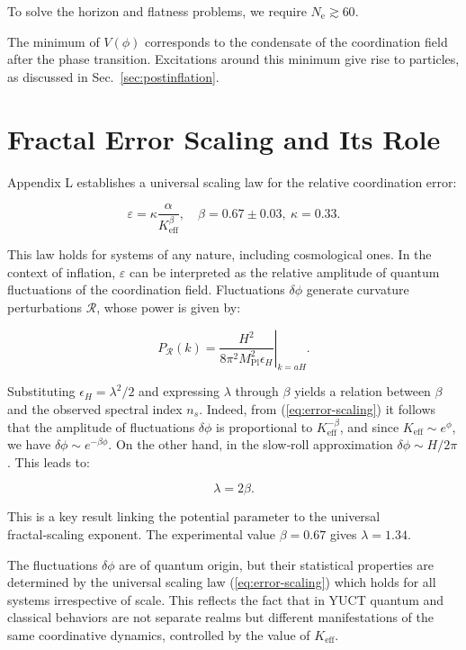 \documentclass[12pt]{article}
\theoremstyle{remark}
\newcommand{\Keff}{K_{\mathrm{eff}}}
\newcommand{\eps}{\varepsilon}
\newcommand{\kappac}{\kappa}
\newcommand{\Mpl}{M_{\mathrm{Pl}}}
\newcommand{\ninf}{N_{\mathrm{e}}}
\begin{document}
	To solve the horizon and flatness problems, we require $\ninf \gtrsim 60$.
	
	The minimum of $V(\phi)$ corresponds to the condensate of the coordination field after the phase transition. Excitations around this minimum give rise to particles, as discussed in Sec.~\ref{sec:postinflation}.
	
	\section{Fractal Error Scaling and Its Role}
	\label{sec:fractal}
	
	Appendix L establishes a universal scaling law for the relative coordination error:
	
	\begin{equation}
		\eps = \kappac \frac{\alpha}{\Keff^{\beta}}, \quad \beta = 0.67 \pm 0.03,\ \kappac = 0.33.
		\label{eq:error-scaling}
	\end{equation}
	
	This law holds for systems of any nature, including cosmological ones. In the context of inflation, $\eps$ can be interpreted as the relative amplitude of quantum fluctuations of the coordination field. Fluctuations $\delta \phi$ generate curvature perturbations $\mathcal{R}$, whose power is given by:
	
	\begin{equation}
		P_{\mathcal{R}}(k) = \left. \frac{H^2}{8\pi^2 \Mpl^2 \epsilon_H} \right|_{k=aH}.
	\end{equation}
	
	Substituting $\epsilon_H = \lambda^2/2$ and expressing $\lambda$ through $\beta$ yields a relation between $\beta$ and the observed spectral index $n_s$. Indeed, from (\ref{eq:error-scaling}) it follows that the amplitude of fluctuations $\delta \phi$ is proportional to $\Keff^{-\beta}$, and since $\Keff \sim e^{\phi}$, we have $\delta \phi \sim e^{-\beta \phi}$. On the other hand, in the slow‑roll approximation $\delta \phi \sim H/2\pi$. This leads to:
	
	\begin{equation}
		\lambda = 2\beta.
		\label{eq:lambda-beta}
	\end{equation}
	
	This is a key result linking the potential parameter to the universal fractal‑scaling exponent. The experimental value $\beta = 0.67$ gives $\lambda = 1.34$.
	
	The fluctuations $\delta\phi$ are of quantum origin, but their statistical properties are determined by the universal scaling law (\ref{eq:error-scaling}) which holds for all systems irrespective of scale. This reflects the fact that in YUCT quantum and classical behaviors are not separate realms but different manifestations of the same coordinative dynamics, controlled by the value of $K_{\mathrm{eff}}$.
	
\end{document}
